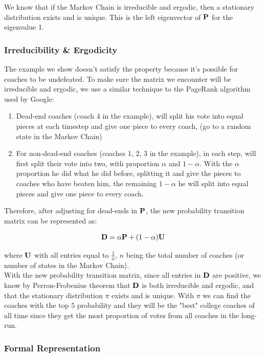 \documentclass[11pt,notitlepage]{article}
\begin{document}
\noindent We know that if the Markov Chain is irreducible and ergodic, then a stationary distribution exists and is unique. This is the left eigenvector of $\bf{P}$ for the eigenvalue 1.


\subsubsection*{Irreducibility \& Ergodicity}

\noindent The example we show doesn't satisfy the property because it's possible for coaches to be undefeated. To make sure the matrix we encounter will be irreducible and ergodic, we use a similar technique to the PageRank\cite{Pagerank} algorithm used by Google:

\begin{enumerate}
\item Dead-end coaches (coach 4 in the example), will split his vote into equal pieces at each timestep and give one piece to every coach, (go to a random state in the Markov Chain)
\item For non-dead-end coaches (coaches 1, 2, 3 in the example), in each step, will first split their vote into two, with proportion $\alpha$ and $1 - \alpha$. With the $\alpha$ proportion he did what he did before, splitting it and give the pieces to coaches who have beaten him, the remaining $1 - \alpha$ he will split into equal pieces and give one piece to every coach.
\end{enumerate}

\noindent Therefore, after adjusting for dead-ends in ${\bf P}$, the new probability transition matrix can be represented as:

$${\bf D} = \alpha {\bf P} + (1 - \alpha) {\bf U}$$

\noindent where $\bf{U}$ with all entries equal to $\frac{1}{n}$, $n$ being the total number of coaches (or number of states in the Markov Chain).
\\

\noindent With the new probability transition matrix, since all entries in $\bf{D}$ are positive, we know by Perron-Frobenius theorem that $\bf{D}$ is both irreducible and ergodic, and that the stationary distribution $\pi$ exists and is unique. With $\pi$ we can find the coaches with the top $5$ probability and they will be the "best" college coaches of all time since they get the most proportion of votes from all coaches in the long-run.

\subsubsection*{Formal Representation}
\end{document}

